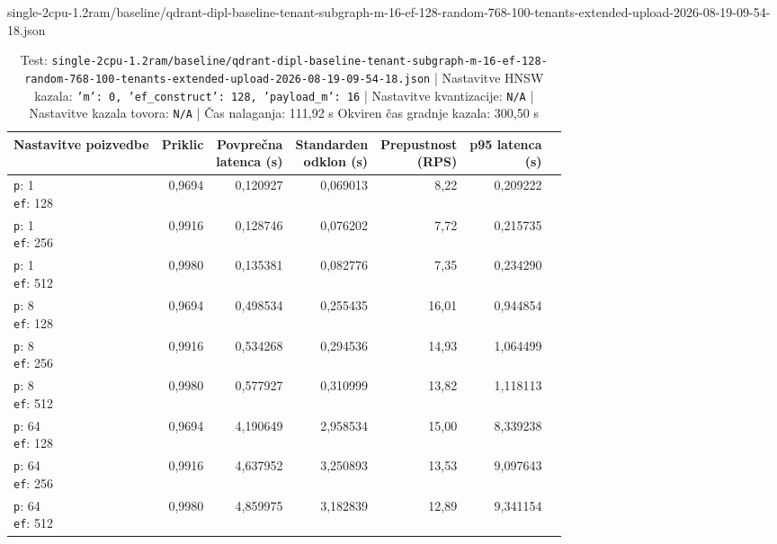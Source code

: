 \begin{table}[htbp]
  \centering
\small
  \caption{single-2cpu-1.2ram/baseline/qdrant-dipl-baseline-tenant-subgraph-m-16-ef-128-random-768-100-tenants-extended-upload-2026-08-19-09-54-18.json}
  \label{tab:single-2cpu-1.2ram:baseline:qdrant-dipl-baseline-tenant-subgraph-m-16-ef-128-random-768-100-tenants-extended-upload-2026-08-19-09-54-18.json}
  \begin{tabularx}{\textwidth}{Xrrrrrr}
    \toprule
    Nastavitve poizvedbe & Priklic & \makecell{Povprečna\\latenca (s)} & \makecell{Standarden\\odklon (s)} & \makecell{Prepustnost\\(RPS)} & \makecell{p95 latenca\\(s)}  \\
    \midrule
    \makecell{\texttt{p}: 1\\\texttt{ef}: 128} & 0,9694 & 0,120927 & 0,069013 & 8,22 & 0,209222 \\
    \makecell{\texttt{p}: 1\\\texttt{ef}: 256} & 0,9916 & 0,128746 & 0,076202 & 7,72 & 0,215735 \\
    \makecell{\texttt{p}: 1\\\texttt{ef}: 512} & 0,9980 & 0,135381 & 0,082776 & 7,35 & 0,234290 \\
    \makecell{\texttt{p}: 8\\\texttt{ef}: 128} & 0,9694 & 0,498534 & 0,255435 & 16,01 & 0,944854 \\
    \makecell{\texttt{p}: 8\\\texttt{ef}: 256} & 0,9916 & 0,534268 & 0,294536 & 14,93 & 1,064499 \\
    \makecell{\texttt{p}: 8\\\texttt{ef}: 512} & 0,9980 & 0,577927 & 0,310999 & 13,82 & 1,118113 \\
    \makecell{\texttt{p}: 64\\\texttt{ef}: 128} & 0,9694 & 4,190649 & 2,958534 & 15,00 & 8,339238 \\
    \makecell{\texttt{p}: 64\\\texttt{ef}: 256} & 0,9916 & 4,637952 & 3,250893 & 13,53 & 9,097643 \\
    \makecell{\texttt{p}: 64\\\texttt{ef}: 512} & 0,9980 & 4,859975 & 3,182839 & 12,89 & 9,341154 \\
    \bottomrule
  \end{tabularx}
\caption* {Test: \texttt{single-2cpu-1.2ram/baseline/qdrant-dipl-baseline-tenant-subgraph-m-16-ef-128-random-768-100-tenants-extended-upload-2026-08-19-09-54-18.json} | Nastavitve HNSW kazala: \texttt{{'m': 0, 'ef\_construct': 128, 'payload\_m': 16}} | Nastavitve kvantizacije: \texttt{N/A} | Nastavitve kazala tovora: \texttt{N/A} | Čas nalaganja: 111,92 s Okviren čas gradnje kazala: 300,50 s}\end{table}


